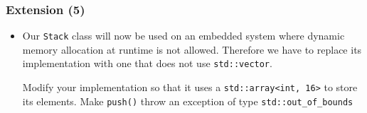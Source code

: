\documentclass[10pt,aspectratio=169]{beamer}
\begin{document}
\begin{frame}[fragile]
  \frametitle{Extension (5)}
  \begin{itemize}
  \item Our \texttt{Stack} class will now be used on an embedded
    system where dynamic memory allocation at runtime is not allowed.
    Therefore we have to replace its implementation with one that does
    not use \verb!std::vector!.

    Modify your implementation so that it uses a
    \verb|std::array<int, 16>| to store its elements. Make
    \texttt{push()} throw an exception of type
    \verb!std::out_of_bounds!
  \end{itemize}
\end{frame}

\end{document}

